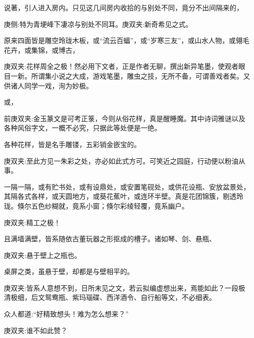 \begin{parag}
    说著，引人进入房内。只见这几间房内收拾的与别处不同，竟分不出间隔来的，\begin{note}庚侧:特为青埂峰下凄凉与别处不同耳。庚双夹:新奇希见之式。\end{note}原来四面皆是雕空玲珑木板，或“流云百蝠”，或“岁寒三友”，或山水人物，或翎毛花卉，或集锦，或博古，\begin{note}庚双夹:花样周全之极！然必用下文者，正是作者无聊，撰出新异笔墨，使观者眼目一新。所谓集小说之大成，游戏笔墨，雕虫之技，无所不备，可谓善戏者矣。又供诸人同学一戏，洵为妙极。\end{note}或，\begin{note}前庚双夹:金玉篆文是可考正箓，今则从俗花样，真是醒睡魔。其中诗词雅谜以及各种风俗字文，一概不必究，只据此等处便是一绝。\end{note}各种花样，皆是名手雕镂，五彩销金嵌宝的。\begin{note}庚双夹:至此方见一朱彩之处，亦必如此式方可。可笑近之园庭，行动便以粉油从事。\end{note}一隔一隔，或有贮书处，或有设鼎处，或安置笔砚处，或供花设瓶、安放盆景处，其隔各式各样，或天圆地方，或葵花蕉叶，或连环半壁。真是花团锦簇，剔透玲珑。倏尔五色纱糊就，竟系小窗；倏尔彩绫轻覆，竟系幽户。\begin{note}庚双夹:精工之极！\end{note}且满墙满壁，皆系随依古董玩器之形抠成的槽子。诸如琴、剑、悬瓶、\begin{note}庚双夹:悬于壁上之瓶也。\end{note}桌屏之类，虽悬于壁，却都是与壁相平的。\begin{note}庚双夹:皆系人意想不到，日所未见之文，若云拟编虚想出来，焉能如此？一段极清极细，后文鸳鸯瓶、紫玛瑙碟、西洋酒令、自行船等文，不必细表。\end{note}众人都道:“好精致想头！难为怎么想来？”\begin{note}庚双夹:谁不如此赞？\end{note}
\end{parag}


